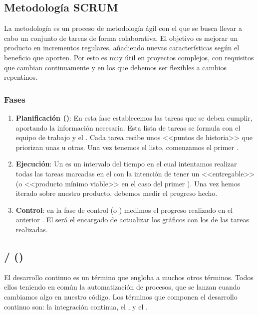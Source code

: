 \subsection{Metodología SCRUM}

La metodología  es un proceso de metodología ágil con el que se busca llevar a cabo un conjunto de tareas de forma colaborativa. El objetivo es mejorar un producto en incrementos regulares, añadiendo nuevas características según el beneficio que aporten. Por esto es muy útil en proyectos complejos, con requisitos que cambian continuamente y en los que debemos ser flexibles a cambios repentinos.

\subsubsection{Fases}

\begin{enumerate}
  \item \textbf{Planificación ()}: En esta fase establecemos las tareas que se deben cumplir, aportando la información necesaria. Esta lista de tareas se formula con el equipo de trabajo y el . Cada tarea recibe unos <<puntos de historia>> que priorizan unas u otras. Una vez tenemos el  listo, comenzamos el primer .

  \item \textbf{Ejecución}: Un  es un intervalo del tiempo en el cual intentamos realizar todas las tareas marcadas en el  con la intención de tener un <<entregable>> (o <<producto mínimo viable>> en el caso del primer ). Una vez hemos iterado sobre nuestro producto, debemos medir el progreso hecho.

  \item \textbf{Control}: en la fase de control (o ) medimos el progreso realizado en el anterior . El  será el encargado de actualizar los gráficos con los  de las tareas realizadas.
\end{enumerate}

\subsection{ /  ()}

El desarrollo continuo es un término que engloba a muchos otros términos. Todos ellos teniendo en común la automatización de procesos, que se lanzan cuando cambiamos algo en nuestro código. Los términos que componen el desarrollo continuo son: la integración continua, el ,  y el .

